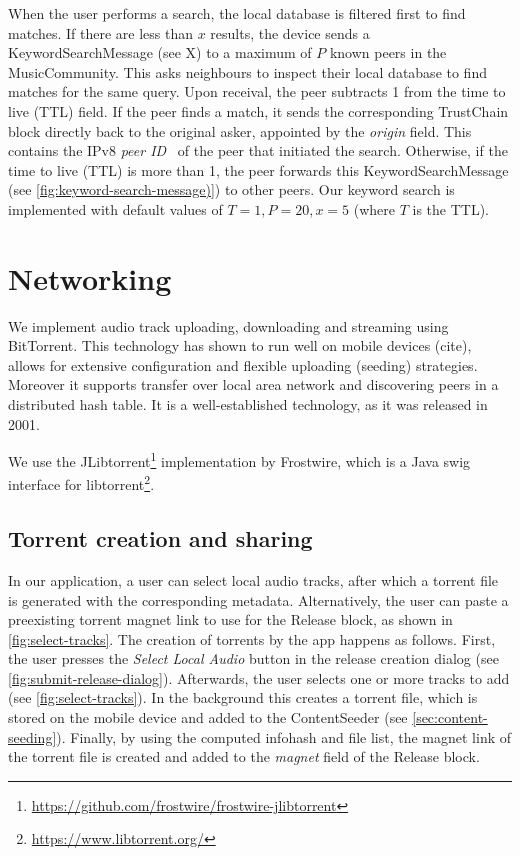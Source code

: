 When the user performs a search, the local database is filtered first to find matches. If there are less than \(x\) results, the device sends a KeywordSearchMessage (see X) to a maximum of \(P\) known peers in the MusicCommunity. This asks neighbours to inspect their local database to find matches for the same query. Upon receival, the peer subtracts 1 from the time to live (TTL) field. If the peer finds a match, it sends the corresponding TrustChain block directly back to the original asker, appointed by the \textit{origin} field. This contains the IPv8 \textit{peer ID}~\citep{mattskala2020} of the peer that initiated the search. Otherwise, if the time to live (TTL) is more than 1, the peer forwards this KeywordSearchMessage (see \ref{fig:keyword-search-message)}) to other peers. Our keyword search is implemented with default values of \(T=1, P=20, x=5\) (where \(T\) is the TTL).

\section{Networking}
We implement audio track uploading, downloading and streaming using BitTorrent. This technology has shown to run well on mobile devices (cite), allows for extensive configuration and flexible uploading (seeding) strategies. Moreover it supports transfer over local area network and discovering peers in a distributed hash table. It is a well-established technology, as it was released in 2001.

We use the JLibtorrent\footnote{\url{https://github.com/frostwire/frostwire-jlibtorrent}} implementation by Frostwire, which is a Java swig interface for libtorrent\footnote{\url{https://www.libtorrent.org/}}.
\subsection{Torrent creation and sharing}
\label{sec:torrent-creation}
In our application, a user can select local audio tracks, after which a torrent file is generated with the corresponding metadata. Alternatively, the user can paste a preexisting torrent magnet link to use for the Release block, as shown in \ref{fig:select-tracks}. The creation of torrents by the app happens as follows. First, the user presses the \textit{Select Local Audio} button in the release creation dialog (see \ref{fig:submit-release-dialog}). Afterwards, the user selects one or more tracks to add (see \ref{fig:select-tracks}). In the background this creates a torrent file, which is stored on the mobile device and added to the ContentSeeder (see \ref{sec:content-seeding}). Finally, by using the computed infohash and file list, the magnet link of the torrent file is created and added to the \textit{magnet} field of the Release block.

